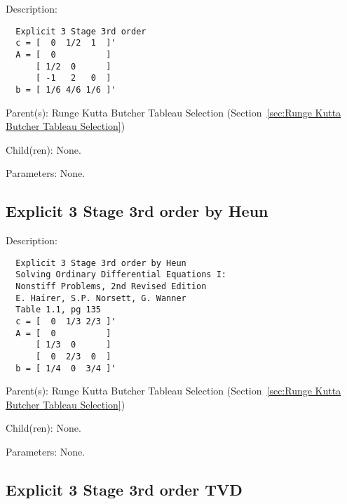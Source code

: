 \begin{list}{}
  {\setlength{\leftmargin}{1.0in}
   \setlength{\labelwidth}{0.75in}
   \setlength{\labelsep}{0.125in}}
  \item[Description:]
\begin{verbatim}
  Explicit 3 Stage 3rd order
  c = [  0  1/2  1  ]'
  A = [  0          ]
      [ 1/2  0      ]
      [ -1   2   0  ]
  b = [ 1/6 4/6 1/6 ]'
\end{verbatim}
  \item[Parent(s):]
    Runge Kutta Butcher Tableau Selection (Section~\ref{sec:Runge Kutta Butcher Tableau Selection})
  \item[Child(ren):]
    None. 
  \item[Parameters:]
    None. 
\end{list}

\subsection{Explicit 3 Stage 3rd order by Heun}
\label{sec:Explicit 3 Stage 3rd order by Heun}

\begin{list}{}
  {\setlength{\leftmargin}{1.0in}
   \setlength{\labelwidth}{0.75in}
   \setlength{\labelsep}{0.125in}}
  \item[Description:]
\begin{verbatim}
  Explicit 3 Stage 3rd order by Heun
  Solving Ordinary Differential Equations I:
  Nonstiff Problems, 2nd Revised Edition
  E. Hairer, S.P. Norsett, G. Wanner
  Table 1.1, pg 135
  c = [  0  1/3 2/3 ]'
  A = [  0          ]
      [ 1/3  0      ]
      [  0  2/3  0  ]
  b = [ 1/4  0  3/4 ]'
\end{verbatim}
  \item[Parent(s):]
    Runge Kutta Butcher Tableau Selection (Section~\ref{sec:Runge Kutta Butcher Tableau Selection})
  \item[Child(ren):]
    None. 
  \item[Parameters:]
    None. 
\end{list}

\subsection{Explicit 3 Stage 3rd order TVD}
\label{sec:Explicit 3 Stage 3rd order TVD}

